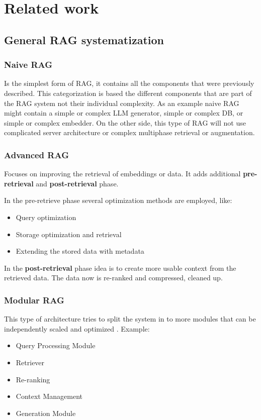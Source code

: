 \documentclass{wseas}
\begin{document}
\section{Related work}

\subsection{General RAG
systematization}

\subsubsection{Naive RAG}

Is the simplest form of RAG, it contains all the components that were 
previously described. This categorization is based the different components 
that are part of the RAG system not their individual complexity. As an example
naive RAG might contain a simple or complex LLM generator, simple or complex DB,
or simple or complex embedder. On the other side, this type of RAG will not 
use complicated server architecture or complex multiphase retrieval or augmentation. 

\subsubsection{Advanced RAG}

Focuses on improving the retrieval of embeddings or data. It adds
additional \textbf{pre-retrieval} and \textbf{post-retrieval} phase. 

In the pre-retrieve phase several optimization methods are employed, like: 
\begin{itemize}
  \item Query optimization 
  \item Storage optimization and retrieval 
  \item Extending the stored data with metadata 
\end{itemize}
  
In the \textbf{post-retrieval} phase idea is to create more usable context 
from the retrieved data. The data now is re-ranked and compressed, cleaned up.

\subsubsection{Modular RAG}

This type of architecture tries to split the system in to more modules
that can be independently scaled and optimized  \cite{Retrieval-Augmented_Generation_for_Large_Language_Models:_A_Survey}. 
Example:
\begin{itemize}
  \item Query Processing Module
  \item Retriever
  \item Re-ranking
  \item Context Management
  \item Generation Module
\end{itemize}
\end{document}
